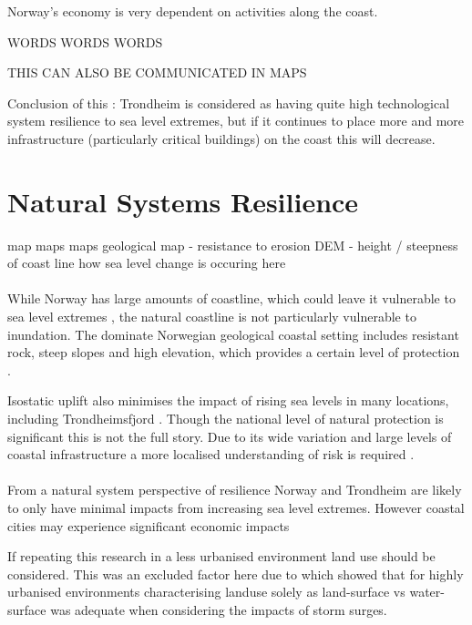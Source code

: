 Norway's economy is very dependent on activities along the coast\cite{aunan_strong_2008}.

WORDS WORDS WORDS

THIS CAN ALSO BE COMMUNICATED IN MAPS

Conclusion of this : Trondheim is considered as having quite high technological system resilience to sea level extremes, but if it continues to place more and more infrastructure (particularly critical buildings) on the coast this will decrease. 

\section{Natural Systems Resilience}
map maps maps
geological map - resistance to erosion
DEM - height / steepness of coast line
how sea level change is occuring here
\paragraph{}
While Norway has large amounts of coastline, which could leave it vulnerable to sea level extremes \cite{aunan_strong_2008}, the natural coastline is not particularly vulnerable to inundation. The dominate Norwegian geological coastal setting includes resistant rock, steep slopes and high elevation, which provides a certain level of protection \cite{aunan_strong_2008}. 

Isostatic uplift also minimises the impact of rising sea levels in many locations, including Trondheimsfjord \cite{aunan_strong_2008}. Though the national level of natural protection is significant this is not the full story. Due to its wide variation and large levels of coastal infrastructure a more localised understanding of risk is required \cite{rod_integrated_2012}. 
\paragraph{}






From a natural system perspective of resilience Norway and Trondheim are likely to only have minimal impacts from increasing sea level extremes. However coastal cities may experience significant economic impacts \cite{aunan_strong_2008}

If repeating this research in a less urbanised environment land use should be considered. This was an excluded factor here due to \cite{hoffken_effects_2020} which showed that for highly urbanised environments characterising landuse solely as land-surface vs water-surface was adequate when considering the impacts of storm surges.


